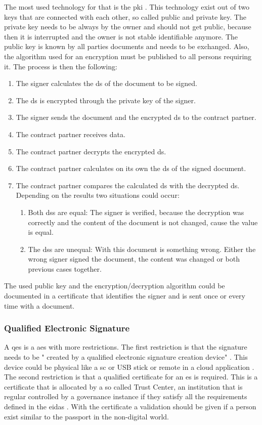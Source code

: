 The most used technology for that is the \gls{pki} \parencite{CEFd2018}. This technology exist out of two keys that are connected with each other, so called public and private key. The private key needs to be always by the owner and should not get public, because then it is interrupted and the owner is not stable identifiable anymore. The public key is known by all parties documents and needs to be exchanged. Also, the algorithm used for an encryption must be published to all persons requiring it. The process is then the following:
\begin{enumerate}
	\item The signer calculates the \gls{ds} of the document to be signed.
	\item The \gls{ds} is encrypted through the private key of the signer.
	\item The signer sends the document and the encrypted \gls{ds} to the contract partner.
	\item The contract partner receives data.
	\item The contract partner decrypts the encrypted \gls{ds}.
	\item The contract partner calculates on its own the \gls{ds} of the signed document.
	\item The contract partner compares the calculated \gls{ds} with the decrypted \gls{ds}. Depending on the results two situations could occur: 
	\begin{enumerate}
		\item Both \glspl{ds} are equal: \newline The signer is verified, because the decryption was correctly and the content of the document is not changed, cause the value is equal.
		\item The \glspl{ds} are unequal: \newline With this document is something wrong. Either the wrong signer signed the document, the content was changed or both previous cases together.
	\end{enumerate}
\end{enumerate}
The used public key and the encryption/decryption algorithm could be documented in a certificate that identifies the signer and is sent once or every time with a document.

\subsubsection{Qualified Electronic Signature}
A \gls{qes} is a \gls{aes} with more restrictions. The first restriction is that the signature needs to be " created   by   a   qualified   electronic   
signature  creation  device" \parencite[Article 3]{eIDAS2014}. This device could be physical like a \gls{sc} or USB stick or remote in a cloud application \parencite{CEFd2018}. The second restriction is that a qualified  certificate  for an \gls{es} is required. This is a certificate that is allocated by a so called Trust Center, an institution that is regular controlled by a governance instance if they satisfy all the requirements defined in the \gls{eidas} \parencite{CEFd2018}. With the certificate a validation should be given if a person exist similar to the passport in the non-digital world.

